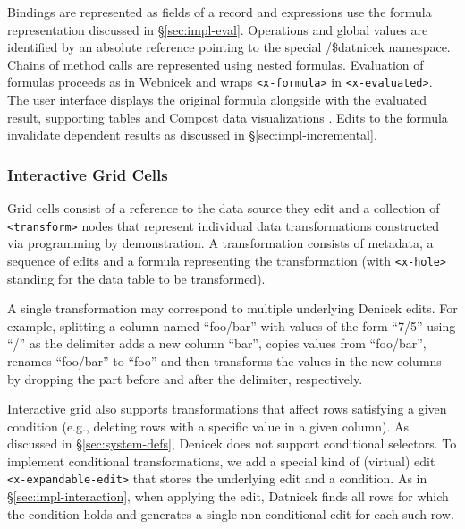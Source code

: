 \documentclass[sigconf]{acmart}
\newcommand{\ident}[1]{{\sffamily #1}}
\begin{document}
Bindings are represented as fields of a record and expressions use the formula representation
discussed in \S\ref{sec:impl-eval}. Operations and global values are identified by an absolute
reference pointing to the special \ident{/\$datnicek} namespace. Chains of method calls are
represented using nested formulas. Evaluation of formulas proceeds as in Webnicek
and wraps {\small\texttt{<x-formula>}} in {\small\texttt{<x-evaluated>}}.
The user interface displays the original formula alongside with the evaluated result, supporting
tables and Compost data visualizations \cite{petricek-2021-compost}. Edits to the formula
invalidate dependent results as discussed in \S\ref{sec:impl-incremental}.

\subsubsection*{Interactive Grid Cells}
Grid cells consist of a reference to the data source they edit and a collection of
{\small\texttt{<transform>}} nodes that represent individual data transformations constructed via
programming by demonstration. A transformation consists of metadata,
a sequence of edits and a formula representing the transformation (with {\small\texttt{<x-hole>}}
standing for the data table to be transformed).

A single transformation may correspond to multiple underlying Denicek edits. For example, splitting a
column named ``foo/bar'' with values of the form ``7/5'' using ``/'' as the delimiter adds a new column ``bar'', copies values from
``foo/bar'', renames ``foo/bar'' to ``foo'' and then transforms the values in the new columns
by dropping the part before and after the delimiter, respectively.

Interactive grid also supports transformations that affect rows satisfying a given
condition (e.g., deleting rows with a specific value in a given column). As discussed
in \S\ref{sec:system-defs}, Denicek does not support conditional selectors.
To implement conditional transformations, we add a special kind of (virtual) edit
{\small\texttt{<x-expandable-edit>}} that stores the underlying edit and a condition.
As in \S\ref{sec:impl-interaction}, when applying the edit, Datnicek finds all rows for which the
condition holds and generates a single non-conditional edit for each such row.


\end{document}
